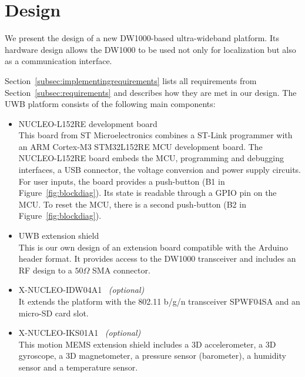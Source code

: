 \documentclass[journal,comsoc]{IEEEtran}
\begin{document}
\section{Design}
\label{sec:design}

We present  the design of a new DW1000-based ultra-wideband platform. 
Its hardware design allows the DW1000 to be used not only for localization but also as a communication interface. 

Section~\ref{subsec:implementingrequirements} lists all requirements from Section~\ref{subsec:requirements} and describes how they are met in our design. 
The UWB platform consists of the following main components:
\begin{itemize}
	\item NUCLEO-L152RE development board\\
	This board from ST Microelectronics combines a ST-Link programmer with an ARM Cortex-M3 STM32L152RE MCU development board. 
	The NUCLEO-L152RE board embeds the MCU, programming and debugging interfaces, a USB connector, the voltage conversion and power supply circuits. 
	For user inputs, the board provides a push-button (B1 in Figure~\ref{fig:blockdiag}). 
	Its state is readable through a GPIO pin on the MCU. 
	To reset the MCU, there is a second push-button (B2 in Figure~\ref{fig:blockdiag}).
	
	\item UWB extension shield\\
	This is our own design of an extension board compatible with the Arduino header format.
	It provides access to the DW1000 transceiver and includes an RF design to a $50\Omega$ SMA connector. 
	
	\item X-NUCLEO-IDW04A1~\cite{wifiboard} \textit{(optional)}\\
	It extends the platform with the 802.11 b/g/n transceiver SPWF04SA and an micro-SD card slot.
	
	\item X-NUCLEO-IKS01A1~\cite{memsboard} \textit{(optional)}\\
	This motion MEMS extension shield includes a 3D accelerometer, a 3D gyroscope, a 3D magnetometer, a pressure sensor (barometer), a humidity sensor and a temperature sensor.
\end{itemize}
\end{document}
